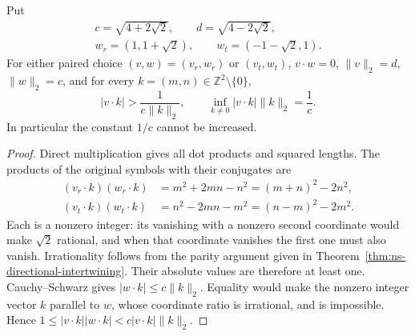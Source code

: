 \begin{theorem}
\label{thm:ns-sharp-denominator}
Put
\[
 \begin{gathered}
 c=\sqrt{4+2\sqrt2},\qquad d=\sqrt{4-2\sqrt2},\\
 w_r=(1,1+\sqrt2),\qquad w_t=(-1-\sqrt2,1).
 \end{gathered}
\]
For either paired choice $(v,w)=(v_r,w_r)$ or $(v_t,w_t)$,
$v\cdot w=0$, $\|v\|_2=d$, $\|w\|_2=c$, and for every
$k=(m,n)\in\mathbb Z^2\setminus\{0\}$,
\[
 |v\cdot k|>\frac1{c\|k\|_2},\qquad
 \inf_{k\ne0}|v\cdot k|\|k\|_2=\frac1c.             \tag{S1}
\]
In particular the constant $1/c$ cannot be increased.
\end{theorem}
\begin{proof}
Direct multiplication gives all dot products and squared lengths.
The products of the original symbols with their conjugates are
\[
 \begin{split}
 (v_r\cdot k)(w_r\cdot k)&=m^2+2mn-n^2=(m+n)^2-2n^2,\\
 (v_t\cdot k)(w_t\cdot k)&=n^2-2mn-m^2=(n-m)^2-2m^2.
 \end{split}                                                     \tag{S2}
\]
Each is a nonzero integer: its vanishing with a nonzero second
coordinate would make $\sqrt2$ rational, and when that coordinate
vanishes the first one must also vanish. Irrationality follows from
the parity argument given in Theorem~\ref{thm:ns-directional-intertwining}.
Their absolute values are therefore at least one. Cauchy--Schwarz
gives $|w\cdot k|\leq c\|k\|_2$. Equality would make the nonzero
integer vector $k$ parallel to $w$, whose coordinate ratio is
irrational, and is impossible. Hence
$1\leq|v\cdot k||w\cdot k|<c|v\cdot k|\|k\|_2$.


\end{proof}
